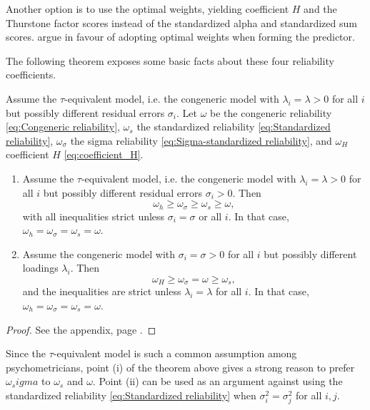 \documentclass[twoside]{article}
\begin{document}
Another option is to use the optimal weights, yielding coefficient $H$ and the Thurstone factor scores instead of the standardized alpha and standardized sum scores. \citet{McNeish2019-ea} argue in favour of adopting optimal weights when forming the predictor.

The following theorem exposes some basic facts about these four reliability coefficients.

\begin{thm}
\label{thm:Properties of three} Assume the $\tau$-equivalent model,
i.e. the congeneric model with $\lambda_{i}=\lambda>0$ for all $i$
but possibly different residual errors $\sigma_{i}$. Let $\omega$ be the congeneric
reliability \eqref{eq:Congeneric reliability}, $\omega_{s}$ the standardized reliability \eqref{eq:Standardized reliability},
$\omega_{\sigma}$ the sigma reliability \eqref{eq:Sigma-standardized reliability},
and $\omega_{H}$ coefficient $H$ \eqref{eq:coefficient_H}. 

\begin{enumerate}[label=(\roman*)]
\item Assume the $\tau$-equivalent model,
i.e. the congeneric model with $\lambda_{i}=\lambda>0$ for all $i$
but possibly different residual errors $\sigma_{i}>0$. Then
\[
\omega_{h}\geq\omega_{\sigma}\geq\omega_{s}\geq\omega,
\]
with all inequalities strict unless $\sigma_{i}=\sigma$ or all
$i$. In that case, $\omega_{h} = \omega_{\sigma} = \omega_{s} = \omega$.
\item Assume the congeneric model with $\sigma_i = \sigma > 0$ for all $i$ but possibly different loadings $\lambda_i$. Then
\[
\omega_{H}\geq\omega_{\sigma}=\omega\geq\omega_{s},
\]
and the inequalities are strict unless $\lambda_{i}=\lambda$ for all
$i$. In that case, $\omega_{h} = \omega_{\sigma} = \omega_{s} = \omega$.

\end{enumerate}

\end{thm}
\begin{proof}
See the appendix, page \pageref{proof:Properties}.
\end{proof}

Since the $\tau$-equivalent model is such a common assumption among psychometricians, point (i) of the theorem above gives a strong reason to prefer $\omega_sigma$ to $\omega_s$ and $\omega$. Point (ii) can be used as an argument against using the standardized reliability \eqref{eq:Standardized reliability} when $\sigma_{i}^{2}=\sigma_j^{2}$ for all $i,j$.
\end{document}
